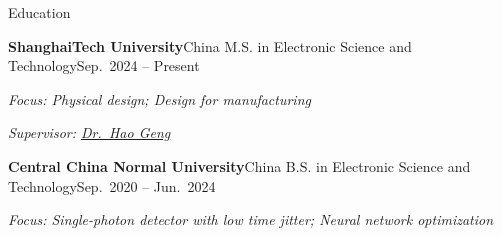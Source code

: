 \documentclass{resume}
\begin{document}

\begin{rSection}{Education}

\begin{rSubsectionNoBullet}%
  {\bf ShanghaiTech University}{China}%
  {M.S. in Electronic Science and Technology}{Sep.\ 2024 -- Present}
    \item \textit{Focus: Physical design; Design for manufacturing}
    \item \textit{Supervisor: \href{https://true-genghao.github.io/genghao/}{Dr.\ Hao Geng}}
\end{rSubsectionNoBullet}

\vspace{0.25em}

\begin{rSubsectionNoBullet}%
  {\bf Central China Normal University}{China}%
  {B.S. in Electronic Science and Technology}{Sep.\ 2020 -- Jun.\ 2024}
    \item \textit{Focus: Single-photon detector with low time jitter; Neural network optimization}
\end{rSubsectionNoBullet}

\end{rSection}
\end{document}
